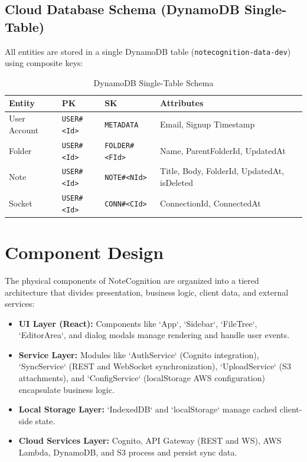 \documentclass[12pt, a4paper, oneside]{report}
\begin{document}
\subsection{Cloud Database Schema (DynamoDB Single-Table)}
All entities are stored in a single DynamoDB table (\texttt{notecognition-data-dev}) using composite keys:

\begin{table}[H]
\centering
\caption{DynamoDB Single-Table Schema}
\label{tab:dynamodb-schema}
\begin{tabularx}{\textwidth}{|l|l|l|X|}
\hline
\textbf{Entity} & \textbf{PK} & \textbf{SK} & \textbf{Attributes} \\
\hline
User Account & \texttt{USER\#<Id>} & \texttt{METADATA} & Email, Signup Timestamp \\
\hline
Folder & \texttt{USER\#<Id>} & \texttt{FOLDER\#<FId>} & Name, ParentFolderId, UpdatedAt \\
\hline
Note & \texttt{USER\#<Id>} & \texttt{NOTE\#<NId>} & Title, Body, FolderId, UpdatedAt, isDeleted \\
\hline
Socket & \texttt{USER\#<Id>} & \texttt{CONN\#<CId>} & ConnectionId, ConnectedAt \\
\hline
\end{tabularx}
\end{table}

\section{Component Design}

The physical components of NoteCognition are organized into a tiered architecture that divides presentation, business logic, client data, and external services:
\begin{itemize}[noitemsep]
    \item \textbf{UI Layer (React):} Components like `App`, `Sidebar`, `FileTree`, `EditorArea`, and dialog modals manage rendering and handle user events.
    \item \textbf{Service Layer:} Modules like `AuthService` (Cognito integration), `SyncService` (REST and WebSocket synchronization), `UploadService` (S3 attachments), and `ConfigService` (localStorage AWS configuration) encapsulate business logic.
    \item \textbf{Local Storage Layer:} `IndexedDB` and `localStorage` manage cached client-side state.
    \item \textbf{Cloud Services Layer:} Cognito, API Gateway (REST and WS), AWS Lambda, DynamoDB, and S3 process and persist sync data.
\end{itemize}
\end{document}
